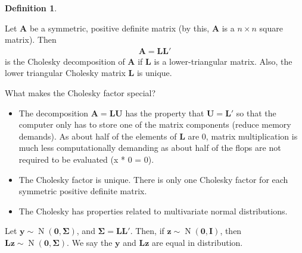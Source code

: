 \documentclass[
]{book}
\theoremstyle{definition}
\newtheorem{definition}{Definition}[chapter]
\theoremstyle{definition}
\theoremstyle{definition}
\theoremstyle{remark}
\begin{document}
\begin{definition}
\protect\hypertarget{def:unlabeled-div-81}{}\label{def:unlabeled-div-81}

Let \(\mathbf{A}\) be a symmetric, positive definite matrix (by this, \(\mathbf{A}\) is a \(n \times n\) square matrix). Then
\[
\begin{aligned}
\mathbf{A} = \mathbf{L} \mathbf{L}'
\end{aligned}
\]
is the Cholesky decomposition of \(\mathbf{A}\) if \(\mathbf{L}\) is a lower-triangular matrix. Also, the lower triangular Cholesky matrix \(\mathbf{L}\) is unique.

\end{definition}

What makes the Cholesky factor special?

\begin{itemize}
\item
  The decomposition \(\mathbf{A} = \mathbf{L} \mathbf{U}\) has the property that \(\mathbf{U} = \mathbf{L}'\) so that the computer only has to store one of the matrix components (reduce memory demands). As about half of the elements of \(\mathbf{L}\) are 0, matrix multiplication is much less computationally demanding as about half of the flops are not required to be evaluated (x * 0 = 0).
\item
  The Cholesky factor is unique. There is only one Cholesky factor for each symmetric positive definite matrix.
\item
  The Cholesky has properties related to multivariate normal distributions.
\end{itemize}

Let \(\mathbf{y} \sim \operatorname{N}(\mathbf{0}, \boldsymbol{\Sigma})\), and \(\boldsymbol{\Sigma} = \mathbf{L} \mathbf{L}'\). Then, if \(\mathbf{z} \sim \operatorname{N}(\mathbf{0}, \mathbf{I})\), then \(\mathbf{L} \mathbf{z} \sim \operatorname{N}(\mathbf{0}, \boldsymbol{\Sigma})\). We say the \(\mathbf{y}\) and \(\mathbf{L}\mathbf{z}\) are equal in distribution.
\end{document}
